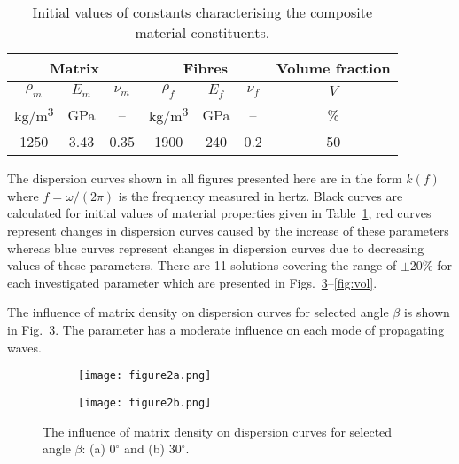  
\begin{table}[h]
\caption{Initial values of constants characterising the composite material constituents.}

 	\renewcommand{\arraystretch}{1.3}
 	\centering \footnotesize
 	
 	 	\begin{tabular}{ccccccc} 
 		 		\toprule
 		\multicolumn{3}{c}{\textbf{Matrix} }	& \multicolumn{3}{c}{\textbf{Fibres} } & \textbf{Volume fraction}	 \\ 
 		 		\midrule
 		\(\rho_m\) & \(E_m\) & \(\nu_m\)  & \(\rho_f\) & \(E_f\) & \(\nu_f\) & \(V\)\\
 		 		 		kg/m\textsuperscript{3} &GPa& --  & kg/m\textsuperscript{3}  & GPa& -- & \%\\ 
 		 		 		\cmidrule(lr){1-3} \cmidrule(lr){4-6} \cmidrule(lr){7-7}
 		1250 &3.43& 0.35& 1900 & 240 & 0.2 & 50\\
 		 		\bottomrule 
 	\end{tabular} 
 	\label{tab:matprop}
 
\end{table}

 
 The dispersion curves shown in all figures presented here are in the form \(k(f)\) where 
 \(f=\omega/(2 \pi)\) is the frequency measured in hertz. Black curves are calculated for 
 initial values of material properties given in Table~\ref{tab:matprop}, red curves 
 represent changes in dispersion curves caused by the increase of these parameters 
 whereas blue curves represent changes in dispersion curves due to decreasing values 
 of these parameters. There are 11 solutions covering the range of \(\pm\)20\% for each 
 investigated parameter which are presented in Figs.~\ref{fig:rhom}--\ref{fig:vol}.
 
 The influence of matrix density on dispersion curves for selected angle \(\beta\) is 
 shown in Fig.~\ref{fig:rhom}. The parameter has a moderate influence on each mode of 
 propagating waves.
 
 
\begin{figure} [h!]
 	\centering
 	\begin{subfigure}[b]{0.49\textwidth}
 		\centering
 		 		 		 	\texttt{[image: figure2a.png]}
 		\caption{}
 		\label{fig:rhom0}
 	\end{subfigure}
 	\hfill
 	\begin{subfigure}[b]{0.49\textwidth}
 		\centering
 		 		 		 		\texttt{[image: figure2b.png]}
 		\caption{}
 		\label{fig:rhom30}
 	\end{subfigure}
 	
\caption{The influence of matrix density on dispersion curves for selected angle 
 	\(\beta\): (a) 0\(^{\circ}\) and (b) 30\(^{\circ}\).}
 
 	\label{fig:rhom}
 \end{figure}
\clearpage


